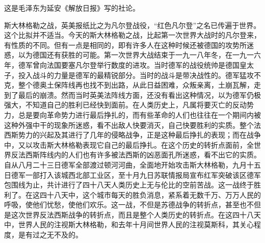 \documentclass[cn,11pt,chinese]{elegantbook}
\begin{document}
\begin{introduction}\item  这是毛泽东为延安《解放日报》写的社论。\end{introduction}
斯大林格勒之战，英美报纸比之为凡尔登战役，“红色凡尔登”之名已传遍于世界。这个比拟并不适当。今天的斯大林格勒之战，比起第一次世界大战时的凡尔登来，有性质的不同。但有一点是相同的，即有许多人在这种时候还被德国的攻势所迷惑，以为德国还有获胜的可能。第一次世界大战结束于一九一八年冬，在一九一六年，德军曾向法国要塞凡尔登举行数度的进攻。当时德军的战役统帅是德国皇太子，投入战斗的力量是德军的最精锐部分。当时的战斗是带决战性的。德军猛攻不克，整个德奥土保阵线再也找不到出路，从此日益困难，众叛亲离，土崩瓦解，走到了最后的崩溃。然而当时英美法阵线方面，还没有看出这种情况，以为德军仍极强大，不知道自己的胜利已经快到面前。在人类历史上，凡属将要灭亡的反动势力，总是要向革命势力进行最后挣扎的，而有些革命的人们也往往在一个期间内被这种外强中干的现象所迷惑，看不出敌人快要消灭，自己快要胜利的实质。整个法西斯势力的兴起及其进行了几年的侵略战争，正是这种最后挣扎的表现；而在战争中，又以攻击斯大林格勒表现它自己的最后挣扎。在这个历史的转折点面前，全世界反法西斯阵线内的人们也有许多被法西斯的凶恶面孔所迷惑，看不出它的实质。自从八月二十三日德军全部渡过顿河河曲，全面地开始攻击斯大林格勒，九月十五日德军一部打入该城西北部工业区，至十月九日苏联情报局宣布红军突破该区德军包围线为止，共计进行了四十八天人类历史上无与伦比的空前苦战。这一战终于胜利了。在这四十八天中，这个城市每天的胜负消息，紧系着无数千万、万万人民的呼吸，使他们忧愁，使他们欢乐。这一战，不但是苏德战争的转折点，甚至也不但是这次世界反法西斯战争的转折点，而且是整个人类历史的转折点。在这四十八天中，世界人民的注视斯大林格勒，和去年十月间世界人民的注视莫斯科，其关心程度，是有过之无不及的。\\
\end{document}
